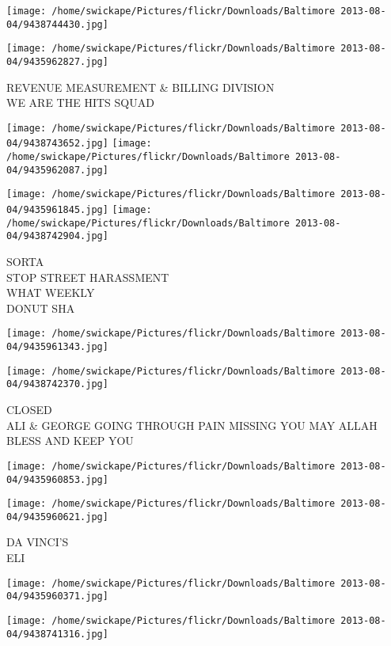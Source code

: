 \documentclass[10pt,letterpaper]{article}
\begin{document}
\texttt{[image: /home/swickape/Pictures/flickr/Downloads/Baltimore 2013-08-04/9438744430.jpg]}

\vspace{0.25in}
\texttt{[image: /home/swickape/Pictures/flickr/Downloads/Baltimore 2013-08-04/9435962827.jpg]}

REVENUE MEASUREMENT \& BILLING DIVISION\\
WE ARE THE HITS SQUAD
\pagebreak

\texttt{[image: /home/swickape/Pictures/flickr/Downloads/Baltimore 2013-08-04/9438743652.jpg]}
\texttt{[image: /home/swickape/Pictures/flickr/Downloads/Baltimore 2013-08-04/9435962087.jpg]}

\texttt{[image: /home/swickape/Pictures/flickr/Downloads/Baltimore 2013-08-04/9435961845.jpg]}
\texttt{[image: /home/swickape/Pictures/flickr/Downloads/Baltimore 2013-08-04/9438742904.jpg]}

SORTA\\
STOP STREET HARASSMENT\\
WHAT WEEKLY\\
DONUT SHA
\pagebreak

\texttt{[image: /home/swickape/Pictures/flickr/Downloads/Baltimore 2013-08-04/9435961343.jpg]}

\vspace{0.25in}
\texttt{[image: /home/swickape/Pictures/flickr/Downloads/Baltimore 2013-08-04/9438742370.jpg]}

CLOSED\\
ALI \& GEORGE GOING THROUGH PAIN MISSING YOU MAY ALLAH BLESS AND KEEP YOU
\pagebreak

\texttt{[image: /home/swickape/Pictures/flickr/Downloads/Baltimore 2013-08-04/9435960853.jpg]}

\vspace{0.25in}
\texttt{[image: /home/swickape/Pictures/flickr/Downloads/Baltimore 2013-08-04/9435960621.jpg]}

DA VINCI'S\\
ELI
\pagebreak

\texttt{[image: /home/swickape/Pictures/flickr/Downloads/Baltimore 2013-08-04/9435960371.jpg]}

\vspace{0.25in}
\texttt{[image: /home/swickape/Pictures/flickr/Downloads/Baltimore 2013-08-04/9438741316.jpg]}
\end{document}
